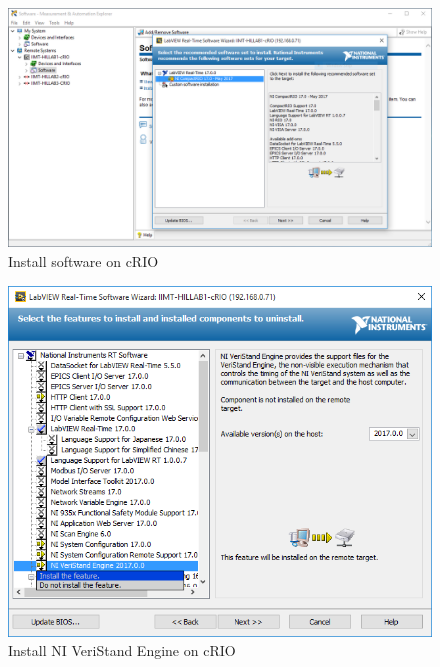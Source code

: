 \documentclass[a4paper,english]{report}
\begin{document}
\begin{figure}[htb!]
	\centering
	\includegraphics[scale=0.4]{fig/crio_install_software.png}
	\caption{Install software on cRIO}
	\label{fig:crio_install_software}
\end{figure}
\begin{figure}[htb!]
	\centering
	\includegraphics[scale=0.6]{fig/crio_custom_install.png}
	\caption{Install NI VeriStand Engine on cRIO}
	\label{fig:crio_custom_install}
\end{figure}
\end{document}

